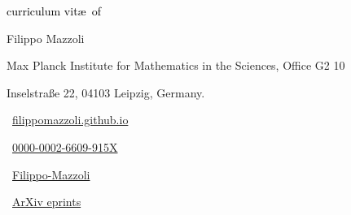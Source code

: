 \begin{scriptsize}
	 \textcolor{black}{curriculum vit\ae~of}
\end{scriptsize}

\begin{Large} 
	Filippo Mazzoli
\end{Large}

\vspace*{0.4em}
\begin{scshape}
	\begin{scriptsize}
		  \textcolor{highlight2}{Max Planck Institute for Mathematics in the Sciences, Office G2 10}
		  
		  \vspace*{-1ex}
		  \textcolor{highlight2}{Inselstraße 22,
		  	04103 Leipzig, Germany.}
	\end{scriptsize}
\end{scshape}
\vspace*{0.25cm}

\begin{footnotesize}
	\begin{tiny}\faHome\end{tiny}~\href{https://filippomazzoli.github.io}
	{filippomazzoli.github.io
	}
	\quad {} 
	
	
	\begin{tiny}\aiOrcid\end{tiny}~\href{https://orcid.org/0000-0002-6609-915X}{0000-0002-6609-915X}
	\quad 
	\begin{tiny}\aiResearchGate\end{tiny}~\href{https://www.researchgate.net/profile/Filippo-Mazzoli}{Filippo-Mazzoli}
		\quad
	\begin{tiny}\aiarXiv\end{tiny}~\href{https://arxiv.org/a/0000-0002-6609-915X.html}{ArXiv eprints}
	

\end{footnotesize}